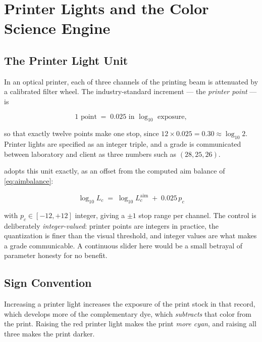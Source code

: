 \section{Printer Lights and the Color Science Engine}
\label{sec:printerlights}

\subsection{The Printer Light Unit}

In an optical printer, each of three channels of the printing beam is attenuated
by a calibrated filter wheel. The industry-standard increment --- the
\emph{printer point} --- is

\begin{equation}
1 \text{ point} \;=\; 0.025 \text{ in } \log_{10} \text{ exposure},
\end{equation}

so that exactly twelve points make one stop, since $12 \times 0.025 = 0.30
\approx \log_{10} 2$. Printer lights are specified as an integer triple, and a
grade is communicated between laboratory and client as three numbers such as
$(28, 25, 26)$.

\EM{} adopts this unit exactly, as an offset from the computed aim balance of
\eqref{eq:aimbalance}:

\begin{equation}
\boxed{\;\log_{10} L_c \;=\; \log_{10} L_c^{\mathrm{aim}} \;+\; 0.025\, p_c\;}
\label{eq:printerlights}
\end{equation}

with $p_c \in [-12, +12]$ integer, giving a $\pm 1$ stop range per channel. The
control is deliberately \emph{integer-valued}: printer points are integers in
practice, the quantization is finer than the visual threshold, and integer
values are what makes a grade communicable. A continuous slider here would be a
small betrayal of parameter honesty for no benefit.

\subsection{Sign Convention}

Increasing a printer light increases the exposure of the print stock in that
record, which develops more of the complementary dye, which \emph{subtracts}
that color from the print. Raising the red printer light makes the print
\emph{more cyan}, and raising all three makes the print darker.

